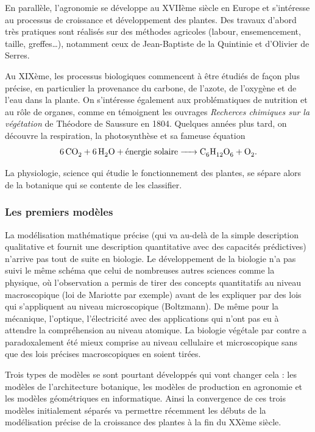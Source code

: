 En parallèle, l’agronomie se développe au XVIIème siècle en Europe
et s’intéresse au processus de croissance et développement des plantes.
Des travaux d’abord très pratiques sont réalisés sur des méthodes agricoles 
(labour, ensemencement, taille, greffes…), notamment ceux de
Jean-Baptiste de la Quintinie et d'Olivier de Serres.

Au XIXème, les processus biologiques commencent à être étudiés de façon plus
précise, en particulier la provenance du carbone, de l’azote,
de l’oxygène et de l’eau dans la plante.
On s'intéresse également aux problématiques de nutrition et
au rôle de organes, comme en témoignent les ouvrages
\emph{Recherces chimiques sur la végétation} de Théodore de Saussure en 1804.
Quelques années plus tard, on découvre la respiration, la photosynthèse
et sa fameuse équation
\begin{equation}
	\ce{6CO2 + 6H2O + \text{énergie solaire} -> C6H12O6 + O2 }.
  \label{eq:photosynthese}
\end{equation}

La physiologie, science qui étudie le fonctionnement des plantes,
se sépare alors de la botanique qui se contente de les classifier.

\subsubsection{Les premiers modèles}

La modélisation mathématique précise (qui va au-delà de la simple
description qualitative et fournit une description quantitative
avec des capacités prédictives) n’arrive pas tout de suite en biologie. 
Le développement de la biologie n’a pas suivi le même schéma que celui de
nombreuses autres sciences comme la physique, où l’observation a permis de
tirer des concepts quantitatifs au niveau macroscopique
(loi de Mariotte par exemple) avant de les expliquer par des lois qui s’appliquent au niveau microscopique (Boltzmann). De même pour la mécanique, l’optique, l’électricité avec des applications qui n’ont pas eu à attendre la compréhension au niveau atomique. La biologie végétale par contre a paradoxalement été mieux comprise au niveau cellulaire et microscopique sans que des lois précises macroscopiques en soient tirées.

Trois types de modèles se sont pourtant développés qui vont changer cela : les modèles de l’architecture botanique, les modèles de production en agronomie et les modèles géométriques en informatique. Ainsi la convergence de ces trois modèles initialement séparés va permettre récemment les débuts de la modélisation précise de la croissance des plantes à la fin du XXème siècle.  

